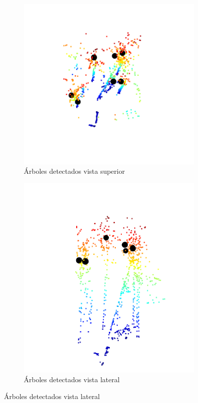 \begin{figure}[h]
\centering
  \begin{subfigure}{0.5\textwidth}
    \centering
    \includegraphics[width=0.9\linewidth]{imaxes/detectcad1.png}
    \caption{Árboles detectados vista superior}
    \label{fig:last1}
  \end{subfigure}%
  
  \begin{subfigure}{0.45\textwidth}
    \centering
    \includegraphics[width=0.9\linewidth]{imaxes/detecad1lat.png}
    \caption{Árboles detectados vista lateral}
    \label{fig:last2}
  \end{subfigure}%
  

\end{figure}
